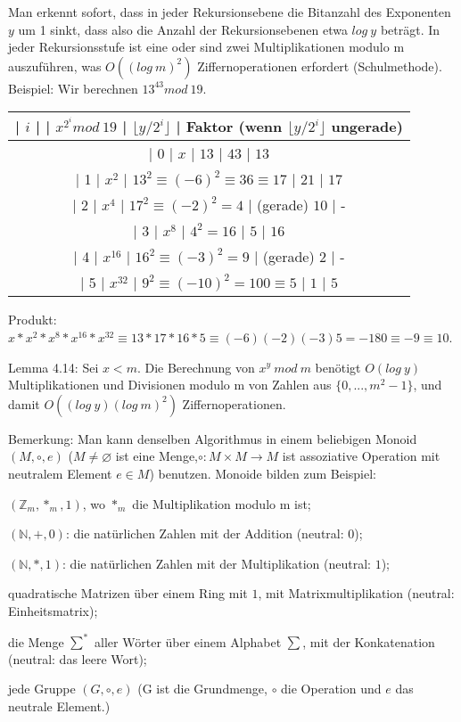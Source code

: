 \documentclass[a4paper]{article}
\begin{document}
\begin{multicols}{3}
    Man erkennt sofort, dass in jeder Rekursionsebene die Bitanzahl des Exponenten $y$ um 1 sinkt, dass also die Anzahl der Rekursionsebenen etwa $log\ y$ beträgt. In jeder Rekursionsstufe ist eine oder sind zwei Multiplikationen modulo m auszuführen, was $O((log\ m)^2)$ Ziffernoperationen erfordert (Schulmethode).
    Beispiel: Wir berechnen $13^{43} mod\ 19$.
    \begin{tabular}{c}
    | $i$ |     | $x^{2^i} mod\ 19$            | $\lfloor y/2^i\rfloor$ | Faktor (wenn $\lfloor y/2^i\rfloor$ ungerade) \\\hline
    | 0  | $x$   | $13$                  | $43$          | $13$                     \\
    | 1  | $x^2$  | $13^2 \equiv (-6)^2 \equiv 36\equiv 17$ | $21$          | $17$    \\
    | 2  | $x^4$  | $17^2 \equiv (-2)^2 = 4$        | (gerade) $10$     | -             \\
    | 3  | $x^8$  | $4^2 = 16$               | $5$          | $16$                     \\
    | 4  | $x^{16}$ | $16^2 \equiv (-3)^2 = 9$        | (gerade) $2$      | -            \\
    | 5  | $x^{32}$ | $9^2 \equiv (-10)^2 = 100\equiv 5$   | $1$          | $5$            
    \end{tabular}

    Produkt: $x*x^2 *x^8 *x^{16} *x^{32} \equiv 13*17*16*5\equiv (-6)(-2)(-3)5 = -180\equiv -9\equiv 10$.

    Lemma 4.14: Sei $x<m$. Die Berechnung von $x^y\ mod\ m$ benötigt $O(log\ y)$ Multiplikationen und Divisionen modulo m von Zahlen aus $\{0,...,m^2-1\}$, und damit $O((log\ y)(log\ m)^2)$ Ziffernoperationen.

    Bemerkung: Man kann denselben Algorithmus in einem beliebigen Monoid $(M,\circ,e)$ ($M\not=\varnothing$ ist eine Menge,$\circ:M\times M \rightarrow M$ ist assoziative Operation mit neutralem Element $e\in M$) benutzen. Monoide bilden zum Beispiel:
    \begin{itemize*}
        \item $(\mathbb{Z}_m ,*_m,1)$, wo $*_m$ die Multiplikation modulo m ist;
        \item $(\mathbb{N},+,0)$: die natürlichen Zahlen mit der Addition (neutral: $0$);
        \item $(\mathbb{N},*,1)$: die natürlichen Zahlen mit der Multiplikation (neutral: $1$);
        \item quadratische Matrizen über einem Ring mit $1$, mit Matrixmultiplikation (neutral: Einheitsmatrix);
        \item die Menge $\sum^*$ aller Wörter über einem Alphabet $\sum$, mit der Konkatenation (neutral: das leere Wort);
        \item jede Gruppe $(G,\circ,e)$ (G ist die Grundmenge, $\circ$ die Operation und $e$ das neutrale Element.)
    \end{itemize*}


\end{multicols}
\end{document}
